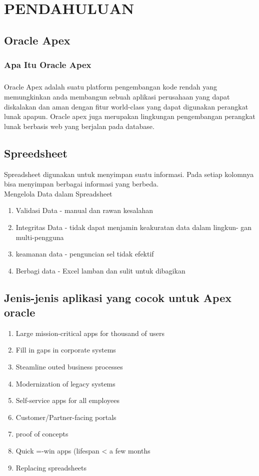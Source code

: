 \documentclass[a4paper,12pt]{report}
\begin{document}
\chapter{PENDAHULUAN}

\section{Oracle Apex}
\subsection{Apa Itu Oracle Apex}

\paragraph{}
	Oracle Apex adalah suatu platform pengembangan kode rendah yang memungkinkan anda membangun sebuah aplikasi perusahaan yang dapat diskalakan dan aman dengan fitur world-class yang dapat digunakan perangkat lunak apapun. Oracle apex juga merupakan lingkungan pengembangan perangkat
lunak berbasis web yang berjalan pada database.


\section{Spreedsheet}
\par Spreadsheet digunakan untuk menyimpan suatu informasi. Pada setiap kolomnya bisa menyimpan berbagai informasi yang berbeda.
\\
Mengelola Data dalam Spreadsheet 
\begin{enumerate}
\item Validasi Data - manual dan rawan kesalahan
\item Integritas Data - tidak dapat menjamin keakuratan data dalam lingkun-
gan multi-pengguna
\item keamanan data - penguncian sel tidak efektif
\item Berbagi data - Excel lamban dan sulit untuk dibagikan
\end{enumerate}

\section{Jenis-jenis aplikasi yang cocok untuk Apex oracle}
\begin{enumerate}
\item Large mission-critical apps for thousand of users
\item Fill in gaps in corporate systems
\item Steamline outed business processes
\item Modernization of legacy systems
\item Self-service apps for all employees
\item Customer/Partner-facing portals
\item proof of concepts
\item Quick =-win apps (lifespan < a few months
\item Replacing spreadsheets
\end{enumerate}
\end{document}
